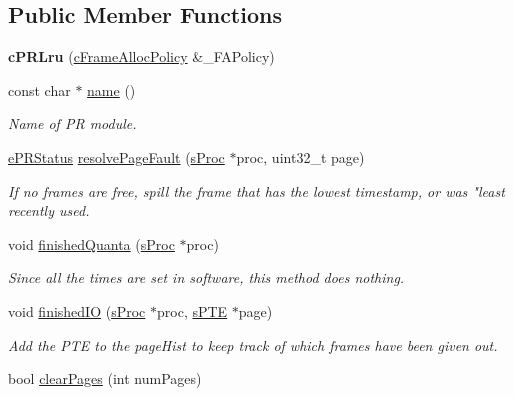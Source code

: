 \subsection*{\-Public \-Member \-Functions}
\begin{DoxyCompactItemize}
\item 
\hypertarget{classcPRLru_a483b47a8f7a83e63fb4a7d02d1b1ba91}{{\bfseries c\-P\-R\-Lru} (\hyperlink{classcFrameAllocPolicy}{c\-Frame\-Alloc\-Policy} \&\-\_\-\-F\-A\-Policy)}\label{da/da5/classcPRLru_a483b47a8f7a83e63fb4a7d02d1b1ba91}

\item 
const char $\ast$ \hyperlink{classcPRLru_aec12730888e052c697b43ed8aca4b8a6}{name} ()
\begin{DoxyCompactList}\small\item\em \-Name of \-P\-R module. \end{DoxyCompactList}\item 
\hyperlink{pageReplace_8h_af4bc4c41a44c2bd80e8cbf1aae370217}{e\-P\-R\-Status} \hyperlink{classcPRLru_aab495ba087dfd717fd9908fb138069bc}{resolve\-Page\-Fault} (\hyperlink{structsProc}{s\-Proc} $\ast$proc, uint32\-\_\-t page)
\begin{DoxyCompactList}\small\item\em \-If no frames are free, spill the frame that has the lowest timestamp, or was "least recently used. \end{DoxyCompactList}\item 
\hypertarget{classcPRLru_a9e0bb304978dddc8342a5b9445c091b6}{void \hyperlink{classcPRLru_a9e0bb304978dddc8342a5b9445c091b6}{finished\-Quanta} (\hyperlink{structsProc}{s\-Proc} $\ast$proc)}\label{da/da5/classcPRLru_a9e0bb304978dddc8342a5b9445c091b6}

\begin{DoxyCompactList}\small\item\em \-Since all the times are set in software, this method does nothing. \end{DoxyCompactList}\item 
\hypertarget{classcPRLru_a003230ac7e50911cfa74808ffeefa658}{void \hyperlink{classcPRLru_a003230ac7e50911cfa74808ffeefa658}{finished\-I\-O} (\hyperlink{structsProc}{s\-Proc} $\ast$proc, \hyperlink{structsPTE}{s\-P\-T\-E} $\ast$page)}\label{da/da5/classcPRLru_a003230ac7e50911cfa74808ffeefa658}

\begin{DoxyCompactList}\small\item\em \-Add the \-P\-T\-E to the page\-Hist to keep track of which frames have been given out. \end{DoxyCompactList}\item 
\hypertarget{classcPRLru_ae74d5e116ffad469d9f6417034f4b0d6}{bool \hyperlink{classcPRLru_ae74d5e116ffad469d9f6417034f4b0d6}{clear\-Pages} (int num\-Pages)}\label{da/da5/classcPRLru_ae74d5e116ffad469d9f6417034f4b0d6}


\end{DoxyCompactItemize}
